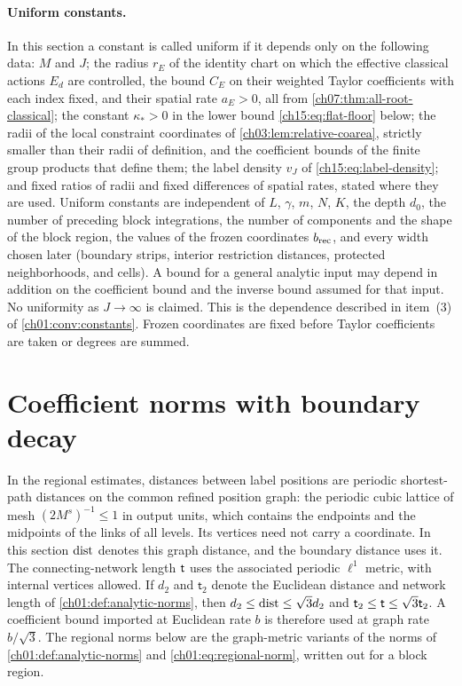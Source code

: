 \paragraph{Uniform constants.}
In this section a constant is called uniform if it depends only on the following data: $M$ and $J$; the radius $r_E$ of the identity chart on which the effective classical actions $E_d$ are controlled, the bound $C_E$ on their weighted Taylor coefficients with each index fixed, and their spatial rate $a_E>0$, all from \cref{ch07:thm:all-root-classical}; the constant $\kappa_*>0$ in the lower bound \eqref{ch15:eq:flat-floor} below; the radii of the local constraint coordinates of \cref{ch03:lem:relative-coarea}, strictly smaller than their radii of definition, and the coefficient bounds of the finite group products that define them; the label density $v_J$ of \eqref{ch15:eq:label-density}; and fixed ratios of radii and fixed differences of spatial rates, stated where they are used. Uniform constants are independent of $L$, $\gamma$, $m$, $N$, $K$, the depth $d_0$, the number of preceding block integrations, the number of components and the shape of the block region, the values of the frozen coordinates $b_{\mathrm{rec}}$, and every width chosen later (boundary strips, interior restriction distances, protected neighborhoods, and cells). A bound for a general analytic input may depend in addition on the coefficient bound and the inverse bound assumed for that input. No uniformity as $J\to\infty$ is claimed. This is the dependence described in item~(3) of \cref{ch01:conv:constants}. Frozen coordinates are fixed before Taylor coefficients are taken or degrees are summed.

\section{Coefficient norms with boundary decay}\label{ch15:sec:norms}

In the regional estimates, distances between label positions are periodic shortest-path distances on the common refined position graph: the periodic cubic lattice of mesh $(2M^s)^{-1}\le1$ in output units, which contains the endpoints and the midpoints of the links of all levels. Its vertices need not carry a coordinate. In this section $\operatorname{dist}$ denotes this graph distance, and the boundary distance uses it. The connecting-network length $\mathsf t$ uses the associated periodic $\ell^1$ metric, with internal vertices allowed. If $d_2$ and $\mathsf t_2$ denote the Euclidean distance and network length of \cref{ch01:def:analytic-norms}, then $d_2\le\operatorname{dist}\le\sqrt3d_2$ and $\mathsf t_2\le\mathsf t\le\sqrt3\mathsf t_2$. A coefficient bound imported at Euclidean rate $b$ is therefore used at graph rate $b/\sqrt3$. The regional norms below are the graph-metric variants of the norms of \cref{ch01:def:analytic-norms} and \eqref{ch01:eq:regional-norm}, written out for a block region.

